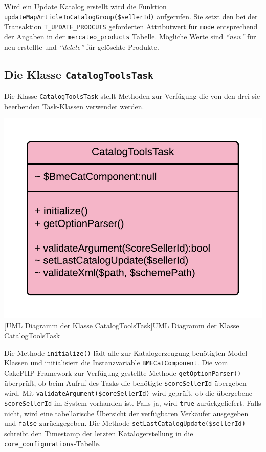 	Wird ein Update Katalog erstellt wird die Funktion \texttt{updateMapArticleToCatalogGroup(\$sellerId)} aufgerufen. Sie setzt den bei der Transaktion \texttt{T\_UPDATE\_PRODCUTS} geforderten Attributwert für \texttt{mode} entsprechend der Angaben in der \texttt{mercateo\_products} Tabelle.
	Mögliche Werte sind \textit{\enquote{new}} für neu erstellte und \textit{\enquote{delete}} für gelöschte Produkte.
	
	\subsection{Die Klasse \texttt{CatalogToolsTask}}
	
	Die Klasse \texttt{CatalogToolsTask} stellt Methoden zur Verfügung die von den drei sie beerbenden Task-Klassen verwendet werden.
	
	\begin{minipage}{\linewidth}
		\vspace{1em}
		\centering
		\includegraphics[width=0.5 \linewidth]{img/CatalogToolsTaskUML}
		[UML Diagramm der Klasse CatalogToolsTask]{UML Diagramm der Klasse CatalogToolsTask}
		\vspace{1em}
	\end{minipage}
	
	Die Methode \texttt{initialize()} lädt alle zur Katalogerzeugung benötigten Model-Klassen und initialisiert die Instanzvariable \texttt{BMECatComponent}.
	Die vom CakePHP-Framework zur Verfügung gestellte Methode \texttt{getOptionParser()} überprüft, ob beim Aufruf des Tasks die benötigte \texttt{\$coreSellerId} übergeben wird.
	Mit \texttt{validateArgument(\$coreSellerId)} wird geprüft, ob die übergebene \texttt{\$coreSellerId} im System vorhanden ist. Falls ja, wird \texttt{true} zurückgeliefert. Falls nicht, wird eine tabellarische Übersicht der verfügbaren Verkäufer ausgegeben und \texttt{false} zurückgegeben. Die Methode \texttt{setLastCatalogUpdate(\$sellerId)} schreibt den Timestamp der letzten Katalogerstellung in die \texttt{core\_configurations}-Tabelle.\\
	
